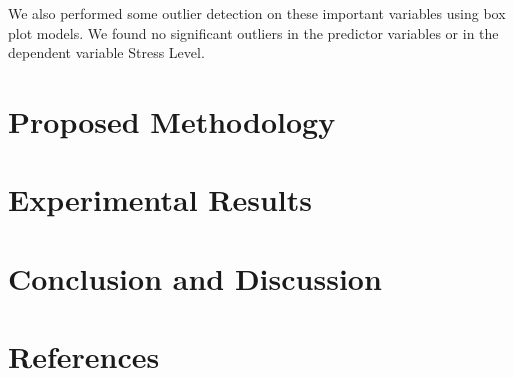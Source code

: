 \documentclass[11pt, letterpaper]{article}
\begin{document}
    We also performed some outlier detection on these important variables using box plot models. We found no significant outliers in the predictor variables or in the dependent variable Stress Level.


    \section*{Proposed Methodology}

    \section*{Experimental Results}

    \section*{Conclusion and Discussion}
    
    \newpage
    \section*{References}
\end{document}
